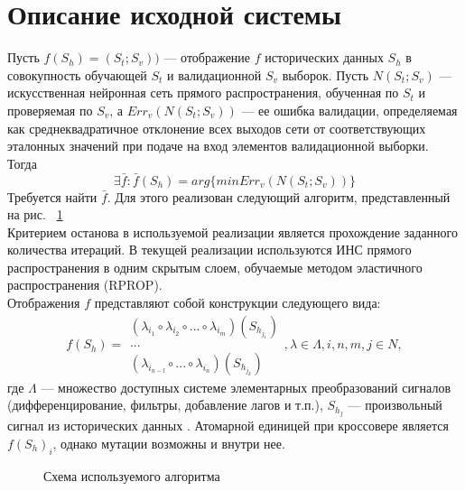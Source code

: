 \documentclass[utf8,usehyperref,14pt]{G7-32}
\begin{document}
\section{Описание исходной системы}
Пусть $ f(S_{h})=(S_{t}; S_{v})) $ --- отображение $f$ исторических данных $S_{h}$ в совокупность обучающей $S_{t}$ и валидационной $S_{v}$ выборок. Пусть $ N(S_{t}; S_{v}) $ --- искусственная нейронная сеть прямого распространения, обученная по $S_{t}$ и проверяемая по $S_{v}$, а $ Err_{v}(N(S_{t}; S_{v})) $ --- ее ошибка валидации, определяемая как среднеквадратичное отклонение всех выходов сети от соответствующих эталонных значений при подаче на вход элементов валидационной выборки. Тогда
\begin{equation}
\exists\bar{f}:\bar{f}(S_{h})=arg\{min Err_{v}(N(S_{t}; S_{v})) \}
\end{equation}
Требуется найти $ \bar{f} $. Для этого реализован следующий алгоритм, представленный на рис. ~\ref{algo} \\
Критерием останова в используемой реализации является прохождение заданного количества итераций. В текущей реализации используются ИНС прямого распространения в одним скрытым слоем, обучаемые методом эластичного распространения (RPROP).\\
Отображения $f$ представляют собой конструкции следующего вида:
\begin{equation}
f(S_{h})=\begin{array}{|c|}
(\lambda_{i_{1}} \circ \lambda_{i_{2}} \circ ... \circ \lambda_{i_{m}})(S_{h_{j_{1}}}) \\
...\\
(\lambda_{i_{n-l}} \circ ... \circ \lambda_{i_{n}})(S_{h_{j_{k}}})
\end{array}
, \lambda\in\Lambda, i,n,m,j\in N,
\end{equation}
где $\Lambda$ --- множество доступных системе элементарных преобразований сигналов (дифференцирование, фильтры, добавление лагов и т.п.), $S_{h_{j}}$ --- произвольный сигнал из исторических данных	. Атомарной единицей при кроссовере является $f(S_{h})_{i}$, однако мутации возможны и внутри нее.\\
\begin{figure}[H]
 \caption{Схема используемого алгоритма}\label{algo}
\end{figure}
\end{document}

